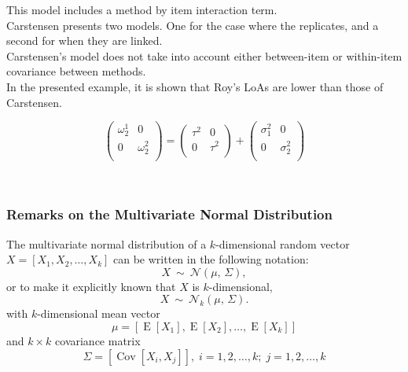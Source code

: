 \documentclass[compress]{beamer}        %
\begin{document}
\begin{frame}
This model includes a method by item interaction term.\\

Carstensen presents two models. One for the case where the replicates, and a second for when they are linked.\\
Carstensen's model does not take into account either between-item or within-item covariance between methods.\\
In the presented example, it is shown that Roy's LoAs are lower than those of Carstensen.


\[\left(\begin{array}{cc}
                \omega^1_2  & 0 \\
              0 & \omega^2_2 \\
            \end{array}  \right)
            =  \left(
            \begin{array}{cc}
              \tau^2  & 0 \\
              0 & \tau^2 \\
            \end{array} \right)+
            \left(
            \begin{array}{cc}
              \sigma^2_1  & 0 \\
              0 & \sigma^2_2 \\
            \end{array}\right)
\]

\end{frame}
\begin{frame}\
\frametitle{Remarks on the Multivariate Normal Distribution}
The multivariate normal distribution of a $k$-dimensional random vector $X = [X_1, X_2, \ldots, X_k]$
can be written in the following notation:
\[
    X\ \sim\ \mathcal{N}(\mu,\, \Sigma),
\]
or to make it explicitly known that $X$ is $k$-dimensional,
\[
    X\ \sim\ \mathcal{N}_k(\mu,\, \Sigma).
\]
with $k$-dimensional mean vector
\[ \mu = [ \operatorname{E}[X_1], \operatorname{E}[X_2], \ldots, \operatorname{E}[X_k]] \]
and $k \times k$ covariance matrix
\[ \Sigma = [\operatorname{Cov}[X_i, X_j]], \; i=1,2,\ldots,k; \; j=1,2,\ldots,k \]

\end{frame}
\end{document}
